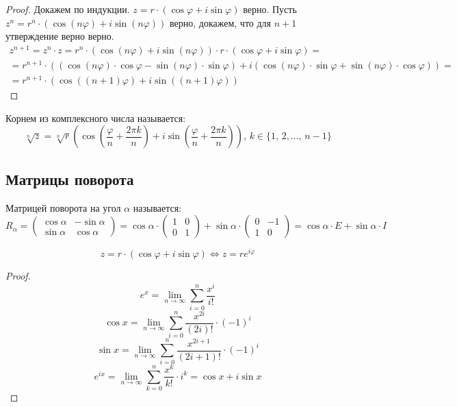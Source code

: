 \documentclass[12pt]{article}
\begin{document}
    \begin{proof}
        Докажем по индукции. $z=r\cdot(\cos\varphi+ i\sin\varphi)$ верно. Пусть $z^n=r^n\cdot(\cos(n\varphi)+i\sin(n\varphi))$ верно, докажем, что для $n+1$ утверждение верно верно.
        \begin{multline*}
            z^{n+1}=z^n\cdot z=r^n\cdot(\cos(n\varphi)+i\sin(n\varphi))\cdot r\cdot(\cos\varphi+ i\sin\varphi)=\\
            =r^{n+1}\cdot((\cos(n\varphi)\cdot\cos\varphi-\sin(n\varphi)\cdot\sin\varphi)+i(\cos(n\varphi)\cdot\sin\varphi+\sin(n\varphi)\cdot\cos\varphi))=\\
            =r^{n+1}\cdot(\cos((n+1)\varphi)+i\sin((n+1)\varphi))
        \end{multline*}
    \end{proof}
    \begin{definition}
        Корнем из комплексного числа называется:
        $$\sqrt[n]{z}=\sqrt[n]{r}\left(\cos\left(\frac{\varphi}{n}+\frac{2\pi k}{n}\right)+i\sin\left(\frac{\varphi}{n}+\frac{2\pi k}{n}\right)\right),\,k\in\{1,\,2,\ldots,\,n-1\}$$
    \end{definition}
    \subsection{Матрицы поворота}
    \begin{definition}
        Матрицей поворота на угол $\alpha$ называется:
        $$R_\alpha=\begin{pmatrix}
            \cos\alpha & -\sin\alpha\\
            \sin\alpha & \cos\alpha
        \end{pmatrix}
        =\cos \alpha \cdot \begin{pmatrix}
            1 & 0\\
            0 & 1
        \end{pmatrix} +\sin \alpha \cdot \begin{pmatrix}
            0 & -1\\
            1 & 0
        \end{pmatrix}=\cos \alpha\cdot E+\sin\alpha\cdot I$$
    \end{definition}
    \begin{statement}
        $$z=r\cdot(\cos\varphi+ i\sin\varphi)\Longleftrightarrow z=re^{i\varphi}$$
    \end{statement}
    \begin{proof}
        $$e^x=\lim_{n\to\infty}\sum_{i=0}^n\dfrac{x^i}{i!}$$
        $$\cos x = \lim_{n\to\infty}\sum_{i=0}^n\dfrac{x^{2i}}{(2i)!}\cdot(-1)^i$$
        $$\sin x = \lim_{n\to\infty}\sum_{i=0}^n\dfrac{x^{2i+1}}{(2i+1)!}\cdot(-1)^i$$
        $$e^{ix}=\lim_{n\to\infty}\sum_{k=0}^n\dfrac{x^k}{k!}\cdot i^k=\cos x+ i\sin x$$
    \end{proof}
\end{document}
